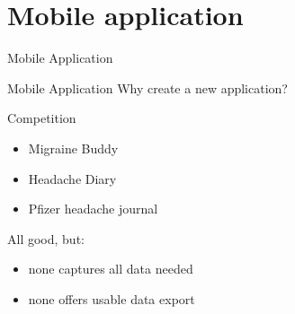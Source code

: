 \documentclass[english]{beamer}
\begin{document}
\section{Mobile application}
\begin{frame}{Mobile Application}
	\centering
	\begin{figure}
	\end{figure}
\end{frame}
\begin{frame}{Mobile Application}
	Why create a new application? 
	\begin{block}{Competition}{}
		\begin{itemize}
			\item Migraine Buddy
			\item Headache Diary
			\item Pfizer headache journal
		\end{itemize}
	\end{block}
	\pause
	All good, but:
	\pause
	\begin{itemize}
		\item none captures all data needed
		\item none offers usable data export
	\end{itemize} 
\end{frame}
\end{document}
